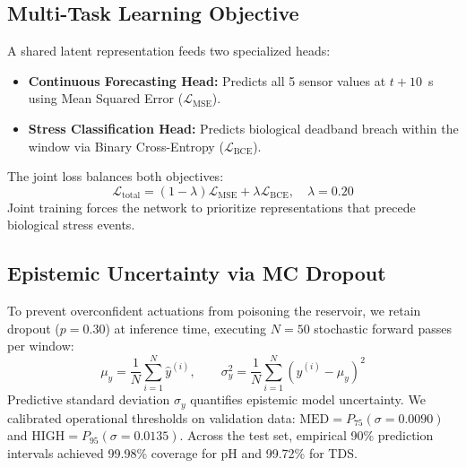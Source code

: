 \documentclass[conference]{IEEEtran}
\begin{document}
\subsection{Multi-Task Learning Objective}
A shared latent representation feeds two specialized heads:
\begin{itemize}
    \item \textbf{Continuous Forecasting Head:} Predicts all 5 sensor values at $t+10$~s using Mean Squared Error ($\mathcal{L}_{\mathrm{MSE}}$).
    \item \textbf{Stress Classification Head:} Predicts biological deadband breach within the window via Binary Cross-Entropy ($\mathcal{L}_{\mathrm{BCE}}$).
\end{itemize}
The joint loss balances both objectives:
\begin{equation}
\mathcal{L}_{\mathrm{total}} = (1 - \lambda)\mathcal{L}_{\mathrm{MSE}} + \lambda\mathcal{L}_{\mathrm{BCE}}, \quad \lambda = 0.20
\end{equation}
Joint training forces the network to prioritize representations that precede biological stress events.

\subsection{Epistemic Uncertainty via MC Dropout}
To prevent overconfident actuations from poisoning the reservoir, we retain dropout ($p = 0.30$) at inference time, executing $N = 50$ stochastic forward passes per window:
\begin{equation}
\mu_y = \frac{1}{N}\sum_{i=1}^N \hat{y}^{(i)}, \qquad \sigma_y^2 = \frac{1}{N}\sum_{i=1}^N (\hat{y}^{(i)} - \mu_y)^2
\end{equation}
Predictive standard deviation $\sigma_y$ quantifies epistemic model uncertainty. We calibrated operational thresholds on validation data: $\text{MED} = P_{75} (\sigma = 0.0090)$ and $\text{HIGH} = P_{95} (\sigma = 0.0135)$. Across the test set, empirical 90\% prediction intervals achieved 99.98\% coverage for pH and 99.72\% for TDS.
\end{document}
